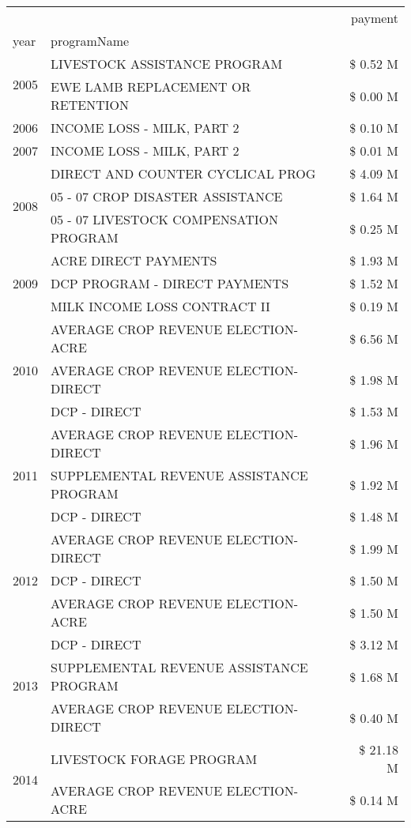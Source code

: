 \begin{tabular}{llr}
\toprule
 &  & payment \\
year & programName &  \\
\midrule
\multirow[t]{2}{*}{2005} & LIVESTOCK ASSISTANCE PROGRAM & \$ 0.52 M \\
 & EWE LAMB REPLACEMENT OR RETENTION & \$ 0.00 M \\
\cline{1-3}
2006 & INCOME LOSS - MILK, PART 2 & \$ 0.10 M \\
\cline{1-3}
2007 & INCOME LOSS - MILK, PART 2 & \$ 0.01 M \\
\cline{1-3}
\multirow[t]{3}{*}{2008} & DIRECT AND COUNTER CYCLICAL PROG & \$ 4.09 M \\
 & 05 - 07 CROP DISASTER ASSISTANCE & \$ 1.64 M \\
 & 05 - 07 LIVESTOCK COMPENSATION PROGRAM & \$ 0.25 M \\
\cline{1-3}
\multirow[t]{3}{*}{2009} & ACRE DIRECT PAYMENTS & \$ 1.93 M \\
 & DCP PROGRAM - DIRECT PAYMENTS & \$ 1.52 M \\
 & MILK INCOME LOSS CONTRACT II & \$ 0.19 M \\
\cline{1-3}
\multirow[t]{3}{*}{2010} & AVERAGE CROP REVENUE ELECTION-ACRE & \$ 6.56 M \\
 & AVERAGE CROP REVENUE ELECTION-DIRECT & \$ 1.98 M \\
 & DCP - DIRECT & \$ 1.53 M \\
\cline{1-3}
\multirow[t]{3}{*}{2011} & AVERAGE CROP REVENUE ELECTION-DIRECT & \$ 1.96 M \\
 & SUPPLEMENTAL REVENUE ASSISTANCE PROGRAM & \$ 1.92 M \\
 & DCP - DIRECT & \$ 1.48 M \\
\cline{1-3}
\multirow[t]{3}{*}{2012} & AVERAGE CROP REVENUE ELECTION-DIRECT & \$ 1.99 M \\
 & DCP - DIRECT & \$ 1.50 M \\
 & AVERAGE CROP REVENUE ELECTION-ACRE & \$ 1.50 M \\
\cline{1-3}
\multirow[t]{3}{*}{2013} & DCP - DIRECT & \$ 3.12 M \\
 & SUPPLEMENTAL REVENUE ASSISTANCE PROGRAM & \$ 1.68 M \\
 & AVERAGE CROP REVENUE ELECTION-DIRECT & \$ 0.40 M \\
\cline{1-3}
\multirow[t]{3}{*}{2014} & LIVESTOCK FORAGE PROGRAM & \$ 21.18 M \\
 & AVERAGE CROP REVENUE ELECTION-ACRE & \$ 0.14 M \\

\end{tabular}
